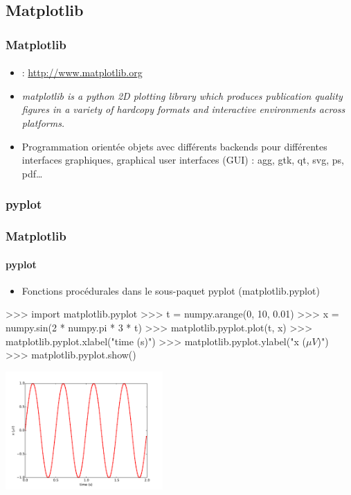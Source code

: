 \subsection{Matplotlib}
\begin{frame}[fragile]
\frametitle{Matplotlib}
\framesubtitle{}
\begin{itemize}
 \item {} : \url{http://www.matplotlib.org}
 \item \emph{matplotlib is a python 2D plotting library which produces publication quality figures in a variety of hardcopy formats and interactive environments across platforms. }
 \item Programmation orientée objets avec différents backends pour différentes interfaces graphiques, graphical user interfaces (GUI) : agg, gtk, qt, svg, ps, pdf\dots
\end{itemize}
\end{frame}
\subsubsection{pyplot}
\begin{frame}[fragile]
\frametitle{Matplotlib}
\framesubtitle{pyplot}
\begin{itemize}
 \item Fonctions procédurales dans le sous-paquet pyplot (matplotlib.pyplot)
\end{itemize}
\begin{pythonConsole}
>>> import matplotlib.pyplot
>>> t = numpy.arange(0, 10, 0.01)
>>> x = numpy.sin(2 * numpy.pi * 3 * t)
>>> matplotlib.pyplot.plot(t, x)
>>> matplotlib.pyplot.xlabel("time (s)")
>>> matplotlib.pyplot.ylabel("x ($\mu V$)")
>>> matplotlib.pyplot.show()
\end{pythonConsole}
\begin{center}
 \includegraphics[width=6cm]{./fig/matplotlibSinus.pdf}
\end{center}
\end{frame}
